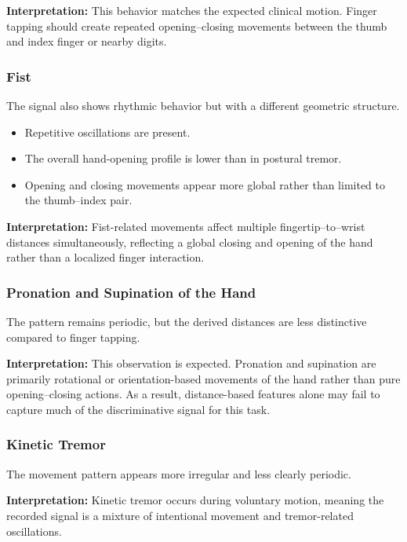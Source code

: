 \documentclass[11pt,twocolumn]{article}
\begin{document}
\textbf{Interpretation:} This behavior matches the expected clinical motion. Finger tapping should create repeated opening--closing movements between the thumb and index finger or nearby digits.

\subsubsection{Fist}

The signal also shows rhythmic behavior but with a different geometric structure.

\begin{itemize}
    \item Repetitive oscillations are present.
    \item The overall hand-opening profile is lower than in postural tremor.
    \item Opening and closing movements appear more global rather than limited to the thumb--index pair.
\end{itemize}

\textbf{Interpretation:} Fist-related movements affect multiple fingertip--to--wrist distances simultaneously, reflecting a global closing and opening of the hand rather than a localized finger interaction.

\subsubsection{Pronation and Supination of the Hand}

The pattern remains periodic, but the derived distances are less distinctive compared to finger tapping.

\textbf{Interpretation:} This observation is expected. Pronation and supination are primarily rotational or orientation-based movements of the hand rather than pure opening--closing actions. As a result, distance-based features alone may fail to capture much of the discriminative signal for this task.

\subsubsection{Kinetic Tremor}

The movement pattern appears more irregular and less clearly periodic.

\textbf{Interpretation:} Kinetic tremor occurs during voluntary motion, meaning the recorded signal is a mixture of intentional movement and tremor-related oscillations.
\end{document}
